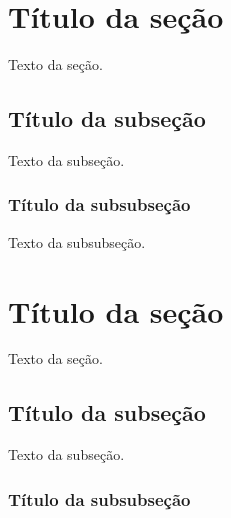 \documentclass[a4paper,12pt,oneside,onecolumn,final,fleqn]{repUERJ}
\begin{document}

\section{Título da seção}

Texto da seção.

\subsection{Título da subseção}

Texto da subseção.

\subsubsection{Título da subsubseção}

Texto da subsubseção.


\section{Título da seção}

Texto da seção.

\subsection{Título da subseção}

Texto da subseção.

\subsubsection{Título da subsubseção}
\end{document}
